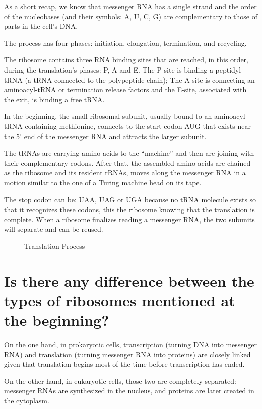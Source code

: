 \documentclass{article}
\begin{document}
As a short recap, we know that messenger RNA has a single strand and the order of the nucleobases (and their symbols: A, U, C, G) are complementary to those of parts in the cell's DNA. 

The process has four phases: initiation, elongation, termination, and recycling.

The ribosome contains three RNA binding sites that are reached, in this order, during the translation’s phases: P, A and E. The P-site is binding a peptidyl-tRNA (a tRNA connected to the polypeptide chain); The A-site is connecting an aminoacyl-tRNA or termination release factors and the E-site, associated with the exit, is binding a free tRNA.

In the beginning, the small ribosomal subunit, usually bound to an aminoacyl-tRNA containing methionine, connects to the start codon AUG that exists near the 5' end of the messenger RNA and attracts the larger subunit. 

The tRNAs are carrying amino acids to the “machine” and then are joining with their complementary codons. After that, the assembled amino acids are chained as the ribosome and its resident rRNAs, moves along the messenger RNA in a motion similar to the one of a Turing machine head on its tape.

The stop codon can be: UAA, UAG or UGA because no tRNA molecule exists so that it recognizes these codons, this the ribosome knowing that the translation is complete. When a ribosome finalizes reading a messenger RNA, the two subunits will separate and can be reused. 

\begin{figure}%
    \centering
    \qquad
    \caption{Translation Process \cite{Wikipedia}}%
\end{figure}

\section{Is there any difference between the types of ribosomes mentioned at the beginning?}

On the one hand, in prokaryotic cells, transcription (turning DNA into messenger RNA) and translation (turning messenger RNA into proteins) are closely linked given that translation begins most of the time before transcription has ended. 

On the other hand, in eukaryotic cells, those two are completely separated: messenger RNAs are synthesized in the nucleus, and proteins are later created in the cytoplasm.



\end{document}
